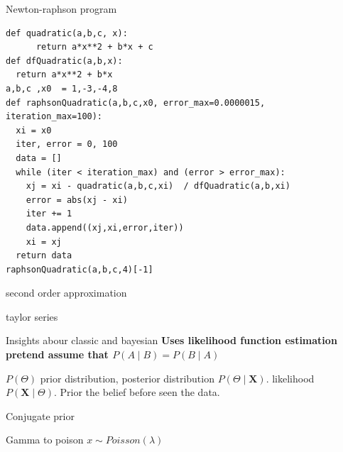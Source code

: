 \documentclass{beamer}
\begin{document}
\begin{frame}[fragile]{Newton-raphson program}
\begin{lstlisting}
def quadratic(a,b,c, x): 
      return a*x**2 + b*x + c
def dfQuadratic(a,b,x): 
  return a*x**2 + b*x
a,b,c ,x0  = 1,-3,-4,8
def raphsonQuadratic(a,b,c,x0, error_max=0.0000015, iteration_max=100):
  xi = x0
  iter, error = 0, 100
  data = []
  while (iter < iteration_max) and (error > error_max):
    xj = xi - quadratic(a,b,c,xi)  / dfQuadratic(a,b,xi)
    error = abs(xj - xi)
    iter += 1
    data.append((xj,xi,error,iter))
    xi = xj
  return data
raphsonQuadratic(a,b,c,4)[-1]
\end{lstlisting}
\end{frame}



\begin{frame}
second order approximation

\end{frame}



\begin{frame}{taylor series}


\end{frame}




\begin{frame}{Insights abour classic and bayesian}
\textbf{Uses likelihood function estimation pretend assume that $P(A \mid B) = P(B \mid A)$}

\end{frame}



\begin{frame}
$P(\Theta)$ prior distribution, posterior distribution $P(\Theta \mid \mathbf{X})$.  likelihood $P(\mathbf{X} \mid \Theta)$.
Prior the belief before seen the data.
\end{frame}




\begin{frame}{Conjugate prior}


\end{frame}


\begin{frame}{Gamma to poison}
$ x \sim Poisson(\lambda) $

\end{frame}
\end{document}
